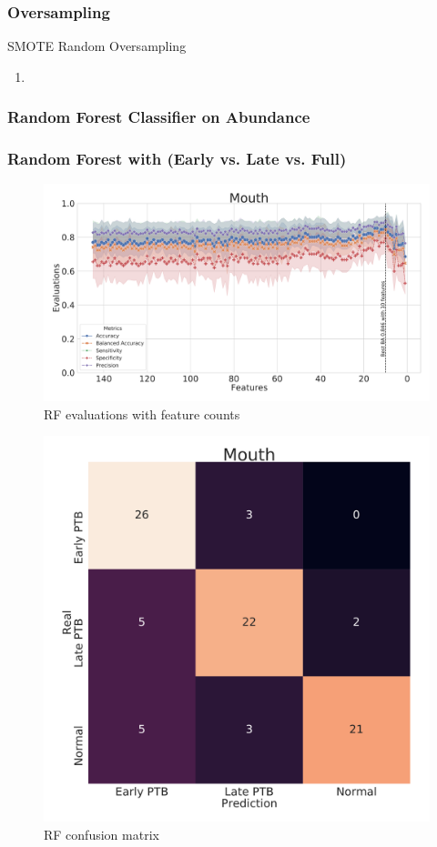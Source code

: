 \documentclass{beamer}
\begin{document}
    \begin{frame}
        \frametitle{Oversampling}

        \begin{block}{SMOTE Random Oversampling}
            \begin{enumerate}
                \item
            \end{enumerate}
        \end{block}
    \end{frame}

    \subsubsection{Random Forest Classifier on Abundance}
    \begin{frame}[allowframebreaks]
        \frametitle{Random Forest with (Early vs. Late vs. Full)}

        \begin{figure}
            \includegraphics[width=0.8 \linewidth]{figures/RandomForest/RF.DADA2.homd.uncorrected/Mouth+metrics.pdf}
            \caption{RF evaluations with feature counts}
        \end{figure}

        \begin{figure}
            \includegraphics[width=0.5 \linewidth]{figures/RandomForest/RF.DADA2.homd.uncorrected/Mouth+heatmap.pdf}
            \caption{RF confusion matrix}
        \end{figure}


\end{frame}
\end{document}
